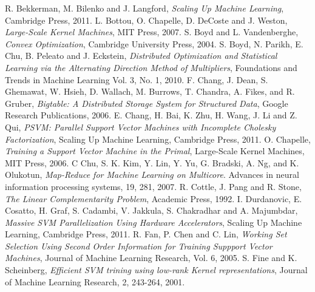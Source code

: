 \documentclass[10pt,oneside, chapterprefix]{scrbook} %
\begin{document}
\tableofcontents







%

\appendix
%

\begin{thebibliography}{99}
		{\sc R. Bekkerman, M. Bilenko and J. Langford}, {\em Scaling Up Machine Learning}, Cambridge Press, 2011.
	{\sc L. Bottou, O. Chapelle, D. DeCoste and J. Weston}, {\em Large-Scale Kernel Machines}, MIT Press, 2007.
		{\sc S. Boyd and L. Vandenberghe}, {\em Convex Optimization}, Cambridge University Press, 2004.
\bibitem{}
		{\sc S. Boyd, N. Parikh, E. Chu, B. Peleato and J. Eckstein}, {\em Distributed Optimization and Statistical Learning via the Alternating Direction Method of Multipliers}, Foundations and Trends in Machine Learning Vol. 3, No. 1, 2010.
		{\sc F. Chang, J. Dean, S. Ghemawat, W. Hsieh, D. Wallach, M. Burrows, T. Chandra, A. Fikes, and R. Gruber},
		{\em Bigtable: A Distributed Storage System for Structured Data}, Google Research Publications, 2006. 
		{\sc E. Chang, H. Bai, K. Zhu, H. Wang, J. Li and Z. Qui}, {\em PSVM: Parallel Support Vector Machines with Incomplete Cholesky Factorization}, Scaling Up Machine Learning, Cambridge Press, 2011.
		{\sc O. Chapelle}, {\em Training a Support Vector Machine in the Primal}, Large-Scale Kernel Machines, MIT Press, 2006.
		{\sc C Chu, S. K. Kim, Y. Lin, Y. Yu, G. Bradski, A. Ng, and K. Olukotun}, {\em Map-Reduce for Machine Learning on Multicore}. Advances in neural information processing systems, 19, 281, 2007.
		{\sc R. Cottle, J. Pang and R. Stone}, {\em The Linear Complementarity Problem}, Academic Press, 1992. 
		{\sc I. Durdanovic, E. Cosatto, H. Graf, S. Cadambi, V. Jakkula, S. Chakradhar and A. Majumbdar}, 
		{\em Massive SVM Parallelization Using Hardware Accelerators}, Scaling Up Machine Learning, Cambridge Press, 2011.
		{\sc R. Fan, P. Chen and C. Lin}, {\em Working Set Selection Using Second Order Information for Training Suppport Vector Machines}, Journal of Machine Learning Research, Vol. 6, 2005.
		{\sc S. Fine and K. Scheinberg}, {\em Efficient SVM trining using low-rank Kernel representations}, Journal of Machine Learning Research, 2, 243-264, 2001.

\end{thebibliography}
\end{document}
